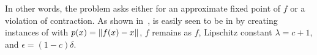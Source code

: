 In other words, the problem asks either for an approximate fixed point of $f$ or
a violation of contraction. As shown in~\cite{daskalakis2011continuous}, \CM is
easily seen to be in \CLS by creating instances of \CLO with $p(x) =
\left\| f(x)-x \right\|$, $f$ remains as $f$, Lipschitz constant $\lambda = c+1$, and $\epsilon =
(1-c)\delta$.
